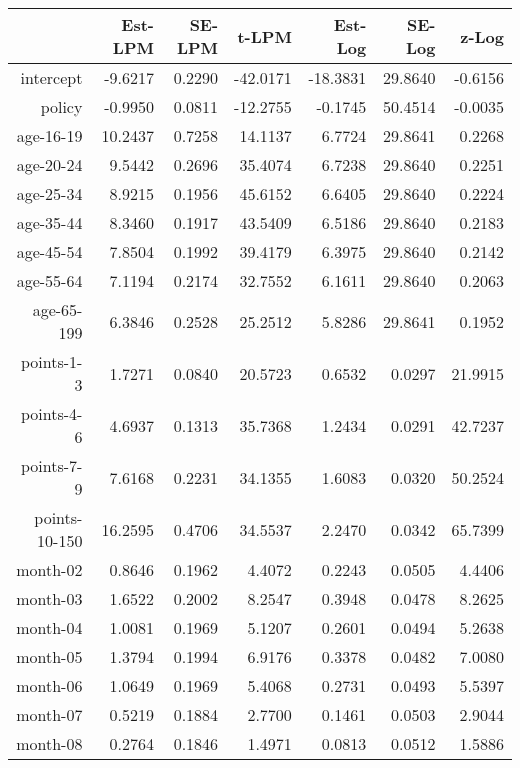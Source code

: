 \documentclass[10pt]{article}
\begin{document}

\begin{table}[ht]
\centering
\begin{tabular}{rrrrrrr}
  \hline
 & Est-LPM & SE-LPM & t-LPM & Est-Log & SE-Log & z-Log \\ 
  \hline
intercept & -9.6217 & 0.2290 & -42.0171 & -18.3831 & 29.8640 & -0.6156 \\ 
  policy & -0.9950 & 0.0811 & -12.2755 & -0.1745 & 50.4514 & -0.0035 \\ 
  age-16-19 & 10.2437 & 0.7258 & 14.1137 & 6.7724 & 29.8641 & 0.2268 \\ 
  age-20-24 & 9.5442 & 0.2696 & 35.4074 & 6.7238 & 29.8640 & 0.2251 \\ 
  age-25-34 & 8.9215 & 0.1956 & 45.6152 & 6.6405 & 29.8640 & 0.2224 \\ 
  age-35-44 & 8.3460 & 0.1917 & 43.5409 & 6.5186 & 29.8640 & 0.2183 \\ 
  age-45-54 & 7.8504 & 0.1992 & 39.4179 & 6.3975 & 29.8640 & 0.2142 \\ 
  age-55-64 & 7.1194 & 0.2174 & 32.7552 & 6.1611 & 29.8640 & 0.2063 \\ 
  age-65-199 & 6.3846 & 0.2528 & 25.2512 & 5.8286 & 29.8641 & 0.1952 \\ 
  points-1-3 & 1.7271 & 0.0840 & 20.5723 & 0.6532 & 0.0297 & 21.9915 \\ 
  points-4-6 & 4.6937 & 0.1313 & 35.7368 & 1.2434 & 0.0291 & 42.7237 \\ 
  points-7-9 & 7.6168 & 0.2231 & 34.1355 & 1.6083 & 0.0320 & 50.2524 \\ 
  points-10-150 & 16.2595 & 0.4706 & 34.5537 & 2.2470 & 0.0342 & 65.7399 \\ 
  month-02 & 0.8646 & 0.1962 & 4.4072 & 0.2243 & 0.0505 & 4.4406 \\ 
  month-03 & 1.6522 & 0.2002 & 8.2547 & 0.3948 & 0.0478 & 8.2625 \\ 
  month-04 & 1.0081 & 0.1969 & 5.1207 & 0.2601 & 0.0494 & 5.2638 \\ 
  month-05 & 1.3794 & 0.1994 & 6.9176 & 0.3378 & 0.0482 & 7.0080 \\ 
  month-06 & 1.0649 & 0.1969 & 5.4068 & 0.2731 & 0.0493 & 5.5397 \\ 
  month-07 & 0.5219 & 0.1884 & 2.7700 & 0.1461 & 0.0503 & 2.9044 \\ 
  month-08 & 0.2764 & 0.1846 & 1.4971 & 0.0813 & 0.0512 & 1.5886 \\ 

\end{tabular}
\end{table}
\end{document}
